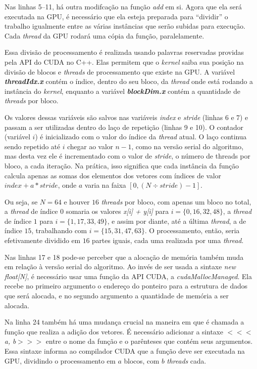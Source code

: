 \documentclass[12pt,
openright, 
oneside, %
a4paper,    %
brazil]{facom-ufu-abntex2}
\begin{document}
Nas linhas 5--11, há outra modifcação na função \textit{add} em si. Agora que ela será executada na GPU, é necessário que ela esteja preparada para \enquote{dividir} o trabalho igualmente entre as várias instâncias que serão subidas para execução. Cada \textit{thread} da GPU rodará uma cópia da função, paralelamente.

Essa divisão de processamento é realizada usando palavras reservadas providas pela API do CUDA no C++. Elas permitem que o \textit{kernel} saiba sua posição na divisão de blocos e \textit{threads} de processamento que existe na GPU. A variável \textbf{\textit{threadIdx.x}} contém o índice, dentro do seu bloco, da \textit{thread} onde está rodando a instância do \textit{kernel}, enquanto a variável \textbf{\textit{blockDim.x}} contém a quantidade de \textit{threads} por bloco.

Os valores dessas variáveis são salvos nas variáveis \textit{index} e \textit{stride} (linhas 6 e 7) e passam a ser utilizadas dentro do laço de repetição (linhas 9 e 10). O contador (variável $i$) é inicializado com o valor do índice da \textit{thread} atual. O laço continua sendo repetido até $i$ chegar ao valor $n - 1$, como na versão serial do algoritmo, mas desta vez ele é incrementado com o valor de \textit{stride}, o número de threads por bloco, a cada iteração. Na prática, isso significa que cada instância da função calcula apenas as somas dos elementos dos vetores com índices de valor \textit{$index + a * stride$}, onde $a$ varia na faixa $[0, (N \div \textit{stride}) - 1]$. 

Ou seja, se $N = 64$ e houver $16$ \textit{threads} por bloco, com apenas um bloco no total, a \textit{thread} de índice $0$ somaria os valores \textit{x[i] + y[i]} para $i = \{0, 16, 32, 48\}$, a \textit{thread} de índice $1$ para $i = \{1, 17, 33, 49\}$, e assim por diante, até a última \textit{thread}, a de índice $15$, trabalhando com $i = \{15, 31, 47, 63\}$. O processamento, então, seria efetivamente dividido em $16$ partes iguais, cada uma realizada por uma \textit{thread}.

Nas linhas 17 e 18 pode-se perceber que a alocação de memória também muda em relação à versão serial do algoritmo. Ao invés de ser usada a sintaxe \textit{new float[N]}, é necessário usar uma função da API CUDA, a \textit{cudaMallocManaged}. Ela recebe no primeiro argumento o endereço do ponteiro para a estrutura de dados que será alocada, e no segundo argumento a quantidade de memória a ser alocada.

Na linha 24 também há uma mudança crucial na maneira em que é chamada a função que realiza a adição dos vetores. É necessário adicionar a sintaxe \textit{$<<<$a, b$>>>$} entre o nome da função e o parênteses que contém seus argumentos. Essa sintaxe informa ao compilador CUDA que a função deve ser executada na GPU, dividindo o processamento em $a$ blocos, com $b$ \textit{threads} cada.
\end{document}
